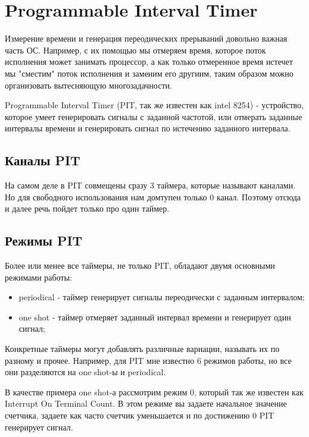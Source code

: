 \section{Programmable Interval Timer}

Измерение времени и генерация переодических прерываний довольно важная часть
ОС. Например, с их помощью мы отмеряем время, которое поток исполнения может
занимать процессор, а как только отмеренное время истечет мы "сместим" поток
исполнения и заменим его другиим, таким образом можно организовать вытесняющую
многозадачности.

Programmable Interval Timer (PIT, так же известен как intel 8254) - устройство,
которое умеет генерировать сигналы с заданной частотой, или отмерать заданные
интервалы времени и генерировать сигнал по истечению заданного интервала.

\subsection{Каналы PIT}

На самом деле в PIT совмещены сразу 3 таймера, которые называют каналами. Но для
свободного использования нам домтупен только 0 канал. Поэтому отсюда и далее
речь пойдет только про один таймер.

\subsection{Режимы PIT}

Более или менее все таймеры, не только PIT, обладают двумя основными режимами
работы:

\begin{itemize}
  \item periodical - таймер генерирует сигналы переодически с заданным
  интервалом;
  \item one shot - таймер отмеряет заданный интервал времени и генерирует один
  сигнал;
\end{itemize}

Конкретные таймеры могут добавлять различные вариации, называть их по разному и
прочее. Например, для PIT мне известно 6 режимов работы, но все они разделяются
на one shot-ы и periodical.

В качестве примера one shot-а рассмотрим режим 0, который так же известен как
Interrupt On Terminal Count. В этом режиме вы задаете начальное значение
счетчика, задаете как часто счетчик уменьшается и по достижению 0 PIT генерирует
сигнал.

